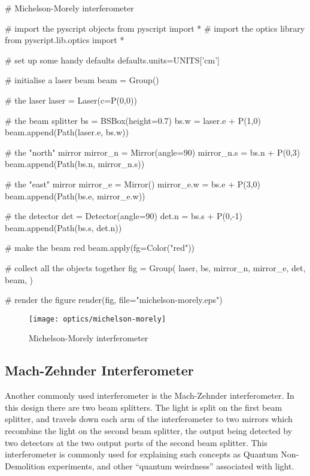 \begin{python}
# Michelson-Morely interferometer

# import the pyscript objects
from pyscript import *
# import the optics library
from pyscript.lib.optics import *

# set up some handy defaults
defaults.units=UNITS['cm']

# initialise a laser beam
beam = Group()

# the laser
laser = Laser(c=P(0,0))

# the beam splitter
bs = BSBox(height=0.7)
bs.w = laser.e + P(1,0)
beam.append(Path(laser.e, bs.w))

# the "north" mirror
mirror_n = Mirror(angle=90)
mirror_n.s = bs.n + P(0,3)
beam.append(Path(bs.n, mirror_n.s))

# the "east" mirror
mirror_e = Mirror()
mirror_e.w = bs.e + P(3,0)
beam.append(Path(bs.e, mirror_e.w))

# the detector
det = Detector(angle=90)
det.n = bs.s + P(0,-1)
beam.append(Path(bs.s, det.n))

# make the beam red
beam.apply(fg=Color("red"))

# collect all the objects together
fig = Group(
        laser,
        bs,
        mirror_n, mirror_e,
        det,
        beam,
        )

# render the figure
render(fig,
        file="michelson-morely.eps")
\end{python}

\begin{figure}[ht]
\centerline{\texttt{[image: optics/michelson-morely]}}
\caption{Michelson-Morely interferometer}
\label{fig:michelson-morely}
\end{figure}

\subsection{Mach-Zehnder Interferometer}

Another commonly used interferometer is the Mach-Zehnder interferometer.  In
this design there are two beam splitters.  The light is split on the first
beam splitter, and travels down each arm of the interferometer to two
mirrors which recombine the light on the second beam splitter, the output
being detected by two detectors at the two output ports of the second beam
splitter.  This interferometer is commonly used for explaining such concepts
as Quantum Non-Demolition experiments, and other ``quantum weirdness''
associated with light.

